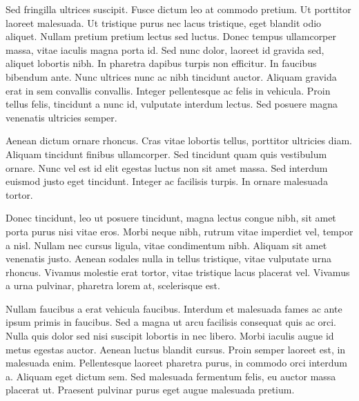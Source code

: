 Sed fringilla ultrices suscipit. Fusce dictum leo at commodo pretium. Ut porttitor laoreet malesuada. Ut tristique purus nec lacus tristique, eget blandit odio aliquet. Nullam pretium pretium lectus sed luctus. Donec tempus ullamcorper massa, vitae iaculis magna porta id. Sed nunc dolor, laoreet id gravida sed, aliquet lobortis nibh. In pharetra dapibus turpis non efficitur. In faucibus bibendum ante. Nunc ultrices nunc ac nibh tincidunt auctor. Aliquam gravida erat in sem convallis convallis. Integer pellentesque ac felis in vehicula. Proin tellus felis, tincidunt a nunc id, vulputate interdum lectus. Sed posuere magna venenatis ultricies semper.

Aenean dictum ornare rhoncus. Cras vitae lobortis tellus, porttitor ultricies diam. Aliquam tincidunt finibus ullamcorper. Sed tincidunt quam quis vestibulum ornare. Nunc vel est id elit egestas luctus non sit amet massa. Sed interdum euismod justo eget tincidunt. Integer ac facilisis turpis. In ornare malesuada tortor.

Donec tincidunt, leo ut posuere tincidunt, magna lectus congue nibh, sit amet porta purus nisi vitae eros. Morbi neque nibh, rutrum vitae imperdiet vel, tempor a nisl. Nullam nec cursus ligula, vitae condimentum nibh. Aliquam sit amet venenatis justo. Aenean sodales nulla in tellus tristique, vitae vulputate urna rhoncus. Vivamus molestie erat tortor, vitae tristique lacus placerat vel. Vivamus a urna pulvinar, pharetra lorem at, scelerisque est.

Nullam faucibus a erat vehicula faucibus. Interdum et malesuada fames ac ante ipsum primis in faucibus. Sed a magna ut arcu facilisis consequat quis ac orci. Nulla quis dolor sed nisi suscipit lobortis in nec libero. Morbi iaculis augue id metus egestas auctor. Aenean luctus blandit cursus. Proin semper laoreet est, in malesuada enim. Pellentesque laoreet pharetra purus, in commodo orci interdum a. Aliquam eget dictum sem. Sed malesuada fermentum felis, eu auctor massa placerat ut. Praesent pulvinar purus eget augue malesuada pretium.
